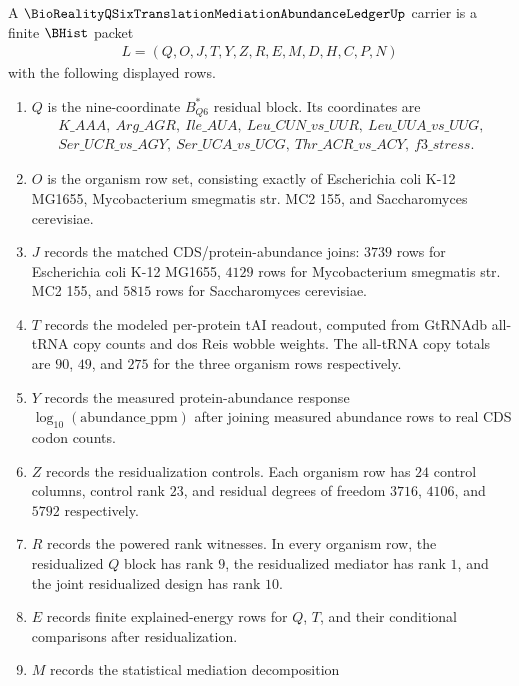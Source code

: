 \begin{definition}
\label{def:bioreality-q-six-translation-mediation-abundance-carrier}
A $\BioRealityQSixTranslationMediationAbundanceLedgerUp$ carrier is a finite $\BHist$ packet
$$
\begin{gathered}
L=(Q,O,J,T,Y,Z,R,E,M,D,H,C,P,N)
\end{gathered}
$$
with the following displayed rows.
\begin{enumerate}
\item $Q$ is the nine-coordinate $B^*_{Q6}$ residual block. Its coordinates are
$$
\begin{gathered}
K\_AAA,\ Arg\_AGR,\ Ile\_AUA,\ Leu\_CUN\_vs\_UUR,\ Leu\_UUA\_vs\_UUG,\\
Ser\_UCR\_vs\_AGY,\ Ser\_UCA\_vs\_UCG,\ Thr\_ACR\_vs\_ACY,\ f3\_stress.
\end{gathered}
$$
\item $O$ is the organism row set, consisting exactly of Escherichia coli K-12 MG1655, Mycobacterium smegmatis str. MC2 155, and Saccharomyces cerevisiae.
\item $J$ records the matched CDS/protein-abundance joins: $3739$ rows for Escherichia coli K-12 MG1655, $4129$ rows for Mycobacterium smegmatis str. MC2 155, and $5815$ rows for Saccharomyces cerevisiae.
\item $T$ records the modeled per-protein tAI readout, computed from GtRNAdb all-tRNA copy counts and dos Reis wobble weights. The all-tRNA copy totals are $90$, $49$, and $275$ for the three organism rows respectively.
\item $Y$ records the measured protein-abundance response $\log_{10}(\mathrm{abundance\_ppm})$ after joining measured abundance rows to real CDS codon counts.
\item $Z$ records the residualization controls. Each organism row has $24$ control columns, control rank $23$, and residual degrees of freedom $3716$, $4106$, and $5792$ respectively.
\item $R$ records the powered rank witnesses. In every organism row, the residualized $Q$ block has rank $9$, the residualized mediator has rank $1$, and the joint residualized design has rank $10$.
\item $E$ records finite explained-energy rows for $Q$, $T$, and their conditional comparisons after residualization.
\item $M$ records the statistical mediation decomposition
$$
\begin{aligned}

\end{aligned}$$
\end{enumerate}
\end{definition}
